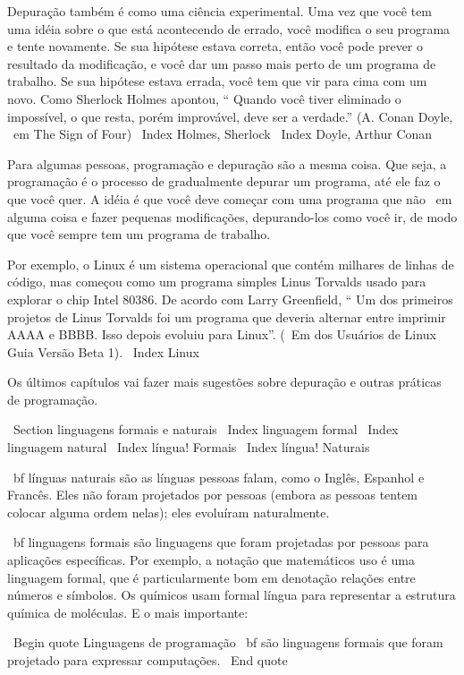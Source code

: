 \documentclass[10pt]{book}
\begin{document}
{Depuração também é como uma ciência experimental. Uma vez que você tem uma idéia
sobre o que está acontecendo de errado, você modifica o seu programa e tente novamente. Se
sua hipótese estava correta, então você pode prever o resultado da
modificação, e você dar um passo mais perto de um programa de trabalho. Se
sua hipótese estava errada, você tem que vir para cima com um novo. Como
Sherlock Holmes apontou, `` Quando você tiver eliminado o
impossível, o que resta, porém improvável, deve ser a verdade.''
(A. Conan Doyle, {\ em The Sign of Four})
\ Index {Holmes, Sherlock}
\ Index {Doyle, Arthur Conan}

Para algumas pessoas, programação e depuração são a mesma coisa. Que
seja, a programação é o processo de gradualmente depurar um programa, até
ele faz o que você quer. A idéia é que você deve começar com uma
programa que não {\ em alguma coisa} e fazer pequenas modificações,
depurando-los como você ir, de modo que você sempre tem um programa de trabalho.

Por exemplo, o Linux é um sistema operacional que contém milhares de
linhas de código, mas começou como um programa simples Linus Torvalds
usado para explorar o chip Intel 80386. De acordo com Larry Greenfield,
`` Um dos primeiros projetos de Linus Torvalds foi um programa que deveria alternar
entre imprimir AAAA e BBBB. Isso depois evoluiu para Linux''.
({\ Em dos Usuários de Linux Guia} Versão Beta 1).
\ Index {Linux}

Os últimos capítulos vai fazer mais sugestões sobre depuração e outras
práticas de programação.


\ Section {linguagens formais e naturais}
\ Index {linguagem formal}
\ Index {linguagem natural}
\ Index {língua! Formais}
\ Index {língua! Naturais}

{\ bf línguas naturais} são as línguas pessoas falam,
como o Inglês, Espanhol e Francês. Eles não foram projetados
por pessoas (embora as pessoas tentem colocar alguma ordem nelas);
eles evoluíram naturalmente.

{\ bf linguagens formais} são linguagens que foram projetadas por pessoas para
aplicações específicas. Por exemplo, a notação que matemáticos
uso é uma linguagem formal, que é particularmente bom em denotação
relações entre números e símbolos. Os químicos usam formal
língua para representar a estrutura química de moléculas. E
o mais importante:

\ Begin {quote}
{Linguagens de programação \ bf são linguagens formais que foram
projetado para expressar computações.}
\ End {quote}

}
\end{document}
